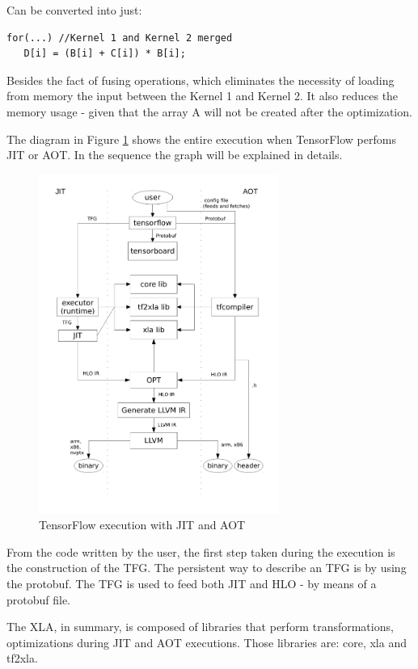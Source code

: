 \documentclass[11pt, fleqn]{article}
\begin{document}
Can be converted into just:

\begin{verbatim}
for(...) //Kernel 1 and Kernel 2 merged
   D[i] = (B[i] + C[i]) * B[i];
\end{verbatim} 

Besides the fact of fusing operations, which eliminates the necessity of loading from memory the input between the Kernel 1 and Kernel 2. It also reduces the memory usage - given that the array A will not be created after the optimization.

The diagram in Figure \ref{fig:xla_2} shows the entire execution when TensorFlow perfoms JIT or AOT. In the sequence the graph will be explained in details.

\begin{figure}[!htb]
    \centering
    \includegraphics[width=0.7\textwidth]{flow/flow.pdf}
    \caption{TensorFlow execution with JIT and AOT}
    \label{fig:xla_2}
\end{figure}

From the code written by the user, the first step taken during the execution is the construction of the TFG. The persistent way to describe an TFG is by using the protobuf. The TFG is used to feed both JIT and HLO - by means of a protobuf file. 

The XLA, in summary, is composed of libraries that perform transformations, optimizations during  JIT and AOT executions. Those libraries are: core, xla and tf2xla.
\end{document}
